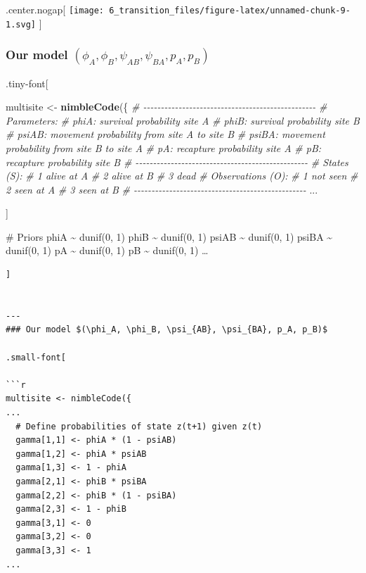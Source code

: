 \documentclass[
]{article}
\newenvironment{Shaded}{\begin{snugshade}}{\end{snugshade}}
\newcommand{\CommentTok}[1]{\textcolor[rgb]{0.56,0.35,0.01}{\textit{#1}}}
\newcommand{\KeywordTok}[1]{\textcolor[rgb]{0.13,0.29,0.53}{\textbf{#1}}}
\newcommand{\NormalTok}[1]{#1}
\newcommand{\StringTok}[1]{\textcolor[rgb]{0.31,0.60,0.02}{#1}}
\begin{document}
.center.nogap{[}
\texttt{[image: 6\_transition\_files/figure-latex/unnamed-chunk-9-1.svg]}
{]}

\hypertarget{our-model-phi_a-phi_b-psi_ab-psi_ba-p_a-p_b}{%
\subsubsection{\texorpdfstring{Our model
\((\phi_A, \phi_B, \psi_{AB}, \psi_{BA}, p_A, p_B)\)}{Our model (\textbackslash phi\_A, \textbackslash phi\_B, \textbackslash psi\_\{AB\}, \textbackslash psi\_\{BA\}, p\_A, p\_B)}}\label{our-model-phi_a-phi_b-psi_ab-psi_ba-p_a-p_b}}

.tiny-font{[}

\begin{Shaded}
\begin{Highlighting}[]
\NormalTok{multisite \textless{}{-}}\StringTok{ }\KeywordTok{nimbleCode}\NormalTok{(\{}
  \CommentTok{\# {-}{-}{-}{-}{-}{-}{-}{-}{-}{-}{-}{-}{-}{-}{-}{-}{-}{-}{-}{-}{-}{-}{-}{-}{-}{-}{-}{-}{-}{-}{-}{-}{-}{-}{-}{-}{-}{-}{-}{-}{-}{-}{-}{-}{-}{-}{-}{-}{-}}
  \CommentTok{\# Parameters:}
  \CommentTok{\# phiA: survival probability site A}
  \CommentTok{\# phiB: survival probability site B}
  \CommentTok{\# psiAB: movement probability from site A to site B}
  \CommentTok{\# psiBA: movement probability from site B to site A}
  \CommentTok{\# pA: recapture probability site A}
  \CommentTok{\# pB: recapture probability site B}
  \CommentTok{\# {-}{-}{-}{-}{-}{-}{-}{-}{-}{-}{-}{-}{-}{-}{-}{-}{-}{-}{-}{-}{-}{-}{-}{-}{-}{-}{-}{-}{-}{-}{-}{-}{-}{-}{-}{-}{-}{-}{-}{-}{-}{-}{-}{-}{-}{-}{-}{-}{-}}
  \CommentTok{\# States (S):}
  \CommentTok{\# 1 alive at A}
  \CommentTok{\# 2 alive at B}
  \CommentTok{\# 3 dead}
  \CommentTok{\# Observations (O):  }
  \CommentTok{\# 1 not seen}
  \CommentTok{\# 2 seen at A }
  \CommentTok{\# 3 seen at B}
  \CommentTok{\# {-}{-}{-}{-}{-}{-}{-}{-}{-}{-}{-}{-}{-}{-}{-}{-}{-}{-}{-}{-}{-}{-}{-}{-}{-}{-}{-}{-}{-}{-}{-}{-}{-}{-}{-}{-}{-}{-}{-}{-}{-}{-}{-}{-}{-}{-}{-}{-}{-}}
\NormalTok{...}
\end{Highlighting}
\end{Shaded}

{]}

\# Priors phiA \textasciitilde{} dunif(0, 1) phiB \textasciitilde{}
dunif(0, 1) psiAB \textasciitilde{} dunif(0, 1) psiBA \textasciitilde{}
dunif(0, 1) pA \textasciitilde{} dunif(0, 1) pB \textasciitilde{}
dunif(0, 1) \ldots{}

\begin{verbatim}
]


---
### Our model $(\phi_A, \phi_B, \psi_{AB}, \psi_{BA}, p_A, p_B)$

.small-font[

```r
multisite <- nimbleCode({
...  
  # Define probabilities of state z(t+1) given z(t)
  gamma[1,1] <- phiA * (1 - psiAB)
  gamma[1,2] <- phiA * psiAB
  gamma[1,3] <- 1 - phiA
  gamma[2,1] <- phiB * psiBA
  gamma[2,2] <- phiB * (1 - psiBA)
  gamma[2,3] <- 1 - phiB
  gamma[3,1] <- 0
  gamma[3,2] <- 0
  gamma[3,3] <- 1
...  
\end{verbatim}
\end{document}
